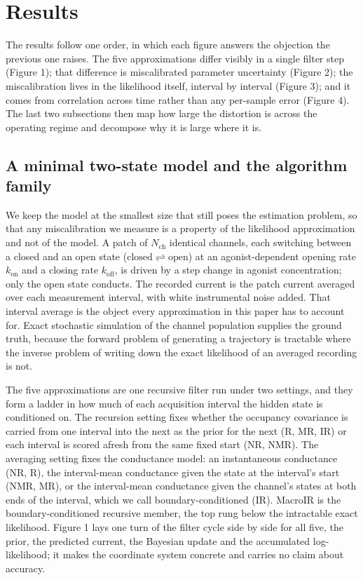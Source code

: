 \providecommand{\todo}{\textbf{[TODO]~}}

\section*{Results}

The results follow one order, in which each figure answers the objection the previous one raises. The five approximations differ visibly in a single filter step (Figure 1); that difference is miscalibrated parameter uncertainty (Figure 2); the miscalibration lives in the likelihood itself, interval by interval (Figure 3); and it comes from correlation across time rather than any per-sample error (Figure 4). The last two subsections then map how large the distortion is across the operating regime and decompose why it is large where it is.

\subsection*{A minimal two-state model and the algorithm family}

We keep the model at the smallest size that still poses the estimation problem, so that any miscalibration we measure is a property of the likelihood approximation and not of the model. A patch of $N_{\mathrm{ch}}$ identical channels, each switching between a closed and an open state ($\mathrm{closed}\rightleftharpoons\mathrm{open}$) at an agonist-dependent opening rate $k_{\mathrm{on}}$ and a closing rate $k_{\mathrm{off}}$, is driven by a step change in agonist concentration; only the open state conducts. The recorded current is the patch current averaged over each measurement interval, with white instrumental noise added. That interval average is the object every approximation in this paper has to account for. Exact stochastic simulation of the channel population supplies the ground truth, because the forward problem of generating a trajectory is tractable where the inverse problem of writing down the exact likelihood of an averaged recording is not.

The five approximations are one recursive filter run under two settings, and they form a ladder in how much of each acquisition interval the hidden state is conditioned on. The recursion setting fixes whether the occupancy covariance is carried from one interval into the next as the prior for the next (R, MR, IR) or each interval is scored afresh from the same fixed start (NR, NMR). The averaging setting fixes the conductance model: an instantaneous conductance (NR, R), the interval-mean conductance given the state at the interval's start (NMR, MR), or the interval-mean conductance given the channel's states at both ends of the interval, which we call boundary-conditioned (IR). MacroIR is the boundary-conditioned recursive member, the top rung below the intractable exact likelihood. Figure 1 lays one turn of the filter cycle side by side for all five, the prior, the predicted current, the Bayesian update and the accumulated log-likelihood; it makes the coordinate system concrete and carries no claim about accuracy.

